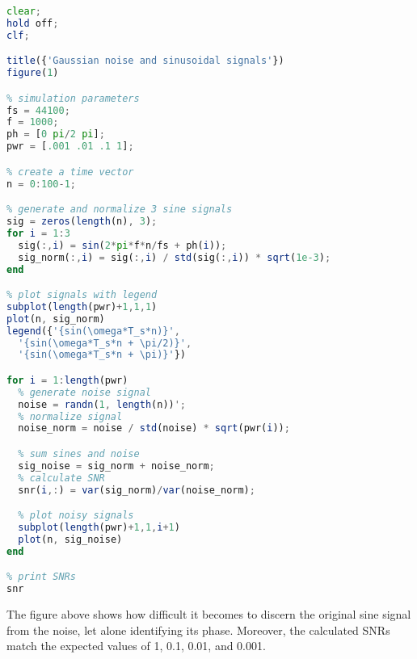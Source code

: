 \begin{lstlisting}[language=Octave]
clear;
hold off;
clf;

title({'Gaussian noise and sinusoidal signals'})
figure(1)

% simulation parameters
fs = 44100;
f = 1000;
ph = [0 pi/2 pi];
pwr = [.001 .01 .1 1];

% create a time vector
n = 0:100-1;

% generate and normalize 3 sine signals
sig = zeros(length(n), 3);
for i = 1:3
  sig(:,i) = sin(2*pi*f*n/fs + ph(i));
  sig_norm(:,i) = sig(:,i) / std(sig(:,i)) * sqrt(1e-3);
end

% plot signals with legend
subplot(length(pwr)+1,1,1)
plot(n, sig_norm)
legend({'{sin(\omega*T_s*n)}',
  '{sin(\omega*T_s*n + \pi/2)}',
  '{sin(\omega*T_s*n + \pi)}'})

for i = 1:length(pwr)
  % generate noise signal
  noise = randn(1, length(n))';
  % normalize signal
  noise_norm = noise / std(noise) * sqrt(pwr(i));

  % sum sines and noise
  sig_noise = sig_norm + noise_norm;
  % calculate SNR
  snr(i,:) = var(sig_norm)/var(noise_norm);

  % plot noisy signals
  subplot(length(pwr)+1,1,i+1)
  plot(n, sig_noise)
end

% print SNRs
snr
\end{lstlisting}

The figure above shows how difficult it becomes to discern the original sine signal from the noise, let alone identifying its phase.
Moreover, the calculated SNRs match the expected values of 1, 0.1, 0.01, and 0.001.
